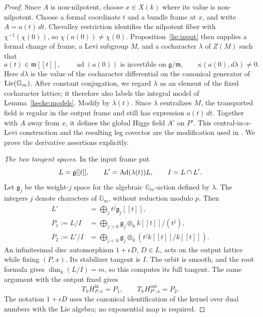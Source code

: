 \begin{proof}
Since $A$ is non-nilpotent, choose $x\in X(k)$ where its value is
non-nilpotent. Choose a formal coordinate $t$ and a bundle frame at $x$,
and write $A=a(t)\,dt$. Chevalley restriction identifies the nilpotent
fiber with $\chi^{-1}(\chi(0))$, so $\chi(a(0))\ne\chi(0)$.
Proposition~\ref{lie:input} then supplies a formal change of frame,
a Levi subgroup $M$, and a cocharacter
$\lambda$ of $Z(M)$ such that
\begin{equation}\label{hecke:lie-data}
 a(t)\in\mathfrak m[[t]],\qquad
 \operatorname{ad}(a(0))
       \text{ is invertible on }\mathfrak g/\mathfrak m,
 \qquad \kappa(a(0),d\lambda)\ne0.
\end{equation}
Here $d\lambda$ is the value of the cocharacter differential on the
canonical generator of $\operatorname{Lie}(\mathbb G_m)$.  After constant conjugation,
we regard $\lambda$ as an element of the fixed cocharacter lattice; it
therefore also labels the integral model of Lemma~\ref{hecke:models}.
Modify by $\lambda(t)$.  Since $\lambda$ centralizes $M$, the transported
field is regular in the output frame and still has expression
$a(t)\,dt$.  Together with $A$ away from $x$, it defines the global Higgs
field $A'$ on $P'$.  This central-in-a-Levi construction and the resulting
leg covector are the modification used in
\cite[\S\S20.4--20.6]{AGKRRV}.  We prove the derivative assertions
explicitly.

\smallskip\noindent
\emph{The two tangent spaces.}
In the input frame put
\[
 L=\mathfrak g[[t]],\qquad
 L'=\operatorname{Ad}(\lambda(t))L,\qquad I=L\cap L'.
\]
Let $\mathfrak g_j$ be the weight-$j$ space for the algebraic
$\mathbb G_m$-action defined by $\lambda$.  The integers $j$ denote
characters of $\mathbb G_m$, without reduction modulo $p$.  Then
\begin{equation}\label{hecke:weight-quotients}
 \begin{split}
 L'&=\bigoplus_j t^j\mathfrak g_j[[t]],\\
 P_1:=L/I&=\bigoplus_{j>0}
                   \mathfrak g_j\otimes_k k[[t]]/(t^j),\\
 P_2:=L'/I&=\bigoplus_{j<0}
                   \mathfrak g_j\otimes_k(t^jk[[t]]/k[[t]]).
 \end{split}
\end{equation}
An infinitesimal disc automorphism $1+\epsilon D$, $D\in L$, acts on the
output lattice while fixing $(P,x)$.  Its stabilizer tangent is $I$.
The orbit is smooth, and the root formula gives
$\dim_k(L/I)=m$, so this computes its full tangent.  The same argument
with the output fixed gives
\begin{equation}\label{hecke:tangents}
 T_hH^{\mathrm{in}}_{P,x}=P_1,
 \qquad T_hH^{\mathrm{out}}_{P',x}=P_2.
\end{equation}
The notation $1+\epsilon D$ uses the canonical identification of the
kernel over dual numbers with the Lie algebra; no exponential map is
required.


\end{proof}
